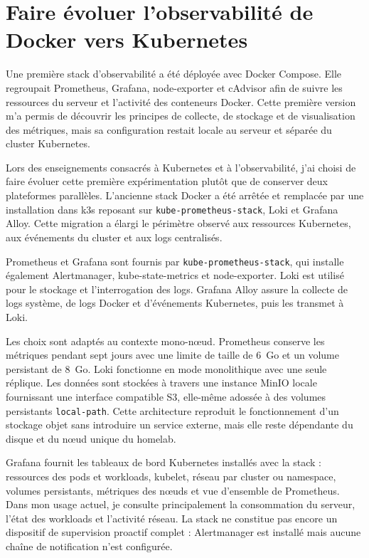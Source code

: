 \section{Faire évoluer l'observabilité de Docker vers Kubernetes}

Une première stack d'observabilité a été déployée avec Docker Compose. Elle regroupait Prometheus, Grafana, node-exporter et cAdvisor afin de suivre les ressources du serveur et l'activité des conteneurs Docker. Cette première version m'a permis de découvrir les principes de collecte, de stockage et de visualisation des métriques, mais sa configuration restait locale au serveur et séparée du cluster Kubernetes.

Lors des enseignements consacrés à Kubernetes et à l'observabilité, j'ai choisi de faire évoluer cette première expérimentation plutôt que de conserver deux plateformes parallèles. L'ancienne stack Docker a été arrêtée et remplacée par une installation dans k3s reposant sur \texttt{kube-prometheus-stack}, Loki et Grafana Alloy. Cette migration a élargi le périmètre observé aux ressources Kubernetes, aux événements du cluster et aux logs centralisés.

Prometheus et Grafana sont fournis par \texttt{kube-prometheus-stack}, qui installe également Alertmanager, kube-state-metrics et node-exporter. Loki est utilisé pour le stockage et l'interrogation des logs. Grafana Alloy assure la collecte de logs système, de logs Docker et d'événements Kubernetes, puis les transmet à Loki.

Les choix sont adaptés au contexte mono-nœud. Prometheus conserve les métriques pendant sept jours avec une limite de taille de 6~Go et un volume persistant de 8~Go. Loki fonctionne en mode monolithique avec une seule réplique. Les données sont stockées à travers une instance MinIO locale fournissant une interface compatible S3, elle-même adossée à des volumes persistants \texttt{local-path}. Cette architecture reproduit le fonctionnement d'un stockage objet sans introduire un service externe, mais elle reste dépendante du disque et du nœud unique du homelab.

Grafana fournit les tableaux de bord Kubernetes installés avec la stack : ressources des pods et workloads, kubelet, réseau par cluster ou namespace, volumes persistants, métriques des nœuds et vue d'ensemble de Prometheus. Dans mon usage actuel, je consulte principalement la consommation du serveur, l'état des workloads et l'activité réseau. La stack ne constitue pas encore un dispositif de supervision proactif complet : Alertmanager est installé mais aucune chaîne de notification n'est configurée.

